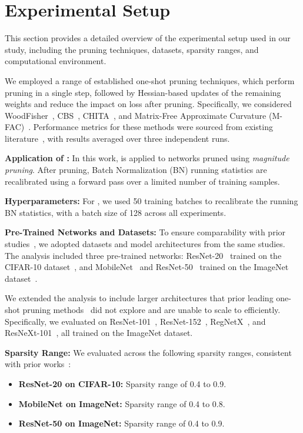 \section{Experimental Setup}\label{sec:appendix_Experimental}

This section provides a detailed overview of the experimental setup used in our study, including the pruning techniques, datasets, sparsity ranges, and computational environment.


We employed a range of established one-shot pruning techniques, which perform pruning in a single step, followed by Hessian-based updates of the remaining weights and reduce the impact on loss after pruning.
Specifically, we considered WoodFisher~\cite{WoodFisher}, CBS~\cite{CBS}, CHITA~\cite{CHITA}, and Matrix-Free Approximate Curvature (M-FAC)~\cite{mfac}. Performance metrics for these methods were sourced from existing literature~\cite{CBS,CHITA}, with results averaged over three independent runs.

\textbf{Application of \REFLOW{}:}  
In this work, \REFLOW{} is applied to networks pruned using \emph{magnitude pruning}. After pruning, Batch Normalization (BN) running statistics are recalibrated using a forward pass over a limited number of training samples. 

\textbf{Hyperparameters:}  
For \REFLOW{}, we used 50 training batches to recalibrate the running BN statistics, with a batch size of 128 across all experiments.

\textbf{Pre-Trained Networks and Datasets:}  
To ensure comparability with prior studies~\cite{CBS,CHITA}, we adopted datasets and model architectures from the same studies. The analysis included three pre-trained networks: ResNet-20~\cite{RESNET} trained on the CIFAR-10 dataset~\cite{CIFAR10}, and MobileNet~\cite{MobileNet} and ResNet-50~\cite{RESNET} trained on the ImageNet dataset~\cite{ImageNet}. 

We extended the analysis to include larger architectures that prior leading one-shot pruning methods~\cite{WoodFisher, CBS} did not explore and are unable to scale to efficiently. Specifically, we evaluated \REFLOW{} on ResNet-101~\cite{RESNET}, ResNet-152~\cite{RESNET}, RegNetX~\cite{radosavovic2020designing}, and ResNeXt-101~\cite{xie2017aggregated}, all trained on the ImageNet dataset.


\textbf{Sparsity Range:}  
We evaluated \REFLOW{} across the following sparsity ranges, consistent with prior works~\cite{CBS,CHITA}:
\begin{itemize}
    \item \textbf{ResNet-20 on CIFAR-10:} Sparsity range of 0.4 to 0.9.
    \item \textbf{MobileNet on ImageNet:} Sparsity range of 0.4 to 0.8.
    \item \textbf{ResNet-50 on ImageNet:} Sparsity range of 0.4 to 0.9.
\end{itemize}


